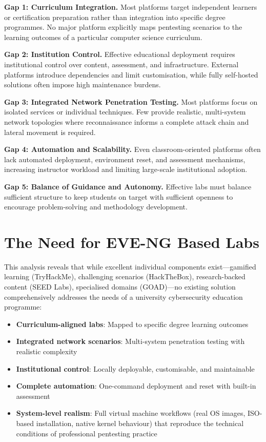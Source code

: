 \textbf{Gap 1: Curriculum Integration.}
Most platforms target independent learners or certification preparation rather than integration
into specific degree programmes. No major platform explicitly maps pentesting scenarios to the
learning outcomes of a particular computer science curriculum.

\textbf{Gap 2: Institution Control.}
Effective educational deployment requires institutional control over content, assessment, and
infrastructure. External platforms introduce dependencies and limit customisation, while
fully self-hosted solutions often impose high maintenance burdens.

\textbf{Gap 3: Integrated Network Penetration Testing.}
Most platforms focus on isolated services or individual techniques. Few provide realistic,
multi-system network topologies where reconnaissance informs a complete attack chain and
lateral movement is required.

\textbf{Gap 4: Automation and Scalability.}
Even classroom-oriented platforms often lack automated deployment, environment reset, and
assessment mechanisms, increasing instructor workload and limiting large-scale institutional
adoption.

\textbf{Gap 5: Balance of Guidance and Autonomy.}
Effective labs must balance sufficient structure to keep students on target with sufficient
openness to encourage problem-solving and methodology development.


\section{The Need for EVE-NG Based Labs}

This analysis reveals that while excellent individual components exist---gamified learning
(TryHackMe), challenging scenarios (HackTheBox), research-backed content (SEED Labs),
specialised domains (GOAD)---no existing solution comprehensively addresses the needs of a
university cybersecurity education programme:

\begin{itemize}
    \item \textbf{Curriculum-aligned labs}: Mapped to specific degree learning outcomes
    \item \textbf{Integrated network scenarios}: Multi-system penetration testing with realistic complexity
    \item \textbf{Institutional control}: Locally deployable, customisable, and maintainable
    \item \textbf{Complete automation}: One-command deployment and reset with built-in assessment
    \item \textbf{System-level realism}: Full virtual machine workflows (real OS images, ISO-based
          installation, native kernel behaviour) that reproduce the technical conditions of
          professional pentesting practice
\end{itemize}

